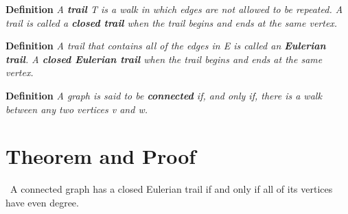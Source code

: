 \documentclass[10pt]{amsart}
\begin{document}
\noindent
\textbf{Definition}
\emph{
    A \textbf{trail} T is a walk in which edges are not allowed to be repeated. A trail is called a 
    \textbf{closed trail} when the trail begins and ends at the same vertex.
}

\noindent
\textbf{Definition}
\emph{
    A trail that contains all of the edges in E is called an \textbf{Eulerian trail}. A \textbf{closed
    Eulerian trail} when the trail begins and ends at the same vertex.
}

\noindent
\textbf{Definition}
\emph{
    A graph is said to be \textbf{connected} if, and only if, there is a walk between any two vertices
    v and w.
}

\section{Theorem and Proof}

\begin{theorem} \ 
    A connected graph has a closed Eulerian trail if and only if all of its vertices have even degree.
    \label{theorem1}
\end{theorem}
\end{document}
